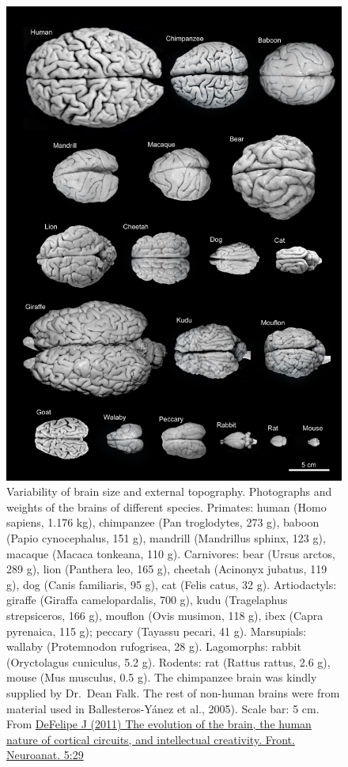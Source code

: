 \begin{figure}

{\centering \includegraphics[width=0.7\linewidth]{./figures/nervoussystem/fnana-05-00029-g007} 

}

\caption{Variability of brain size and external topography. Photographs and weights of the brains of different species. Primates: human (Homo sapiens, 1.176 kg), chimpanzee (Pan troglodytes, 273 g), baboon (Papio cynocephalus, 151 g), mandrill (Mandrillus sphinx, 123 g), macaque (Macaca tonkeana, 110 g). Carnivores: bear (Ursus arctos, 289 g), lion (Panthera leo, 165 g), cheetah (Acinonyx jubatus, 119 g), dog (Canis familiaris, 95 g), cat (Felis catus, 32 g). Artiodactyls: giraffe (Giraffa camelopardalis, 700 g), kudu (Tragelaphus strepsiceros, 166 g), mouflon (Ovis musimon, 118 g), ibex (Capra pyrenaica, 115 g); peccary (Tayassu pecari, 41 g). Marsupials: wallaby (Protemnodon rufogrisea, 28 g). Lagomorphs: rabbit (Oryctolagus cuniculus, 5.2 g). Rodents: rat (Rattus rattus, 2.6 g), mouse (Mus musculus, 0.5 g). The chimpanzee brain was kindly supplied by Dr.~Dean Falk. The rest of non-human brains were from material used in Ballesteros-Yánez et al., 2005). Scale bar: 5 cm. From \href{https://www.frontiersin.org/article/10.3389/fnana.2011.00029}{DeFelipe J (2011) The evolution of the brain, the human nature of cortical circuits, and intellectual creativity. Front. Neuroanat. 5:29}}\label{fig:mammaliancns}
\end{figure}

